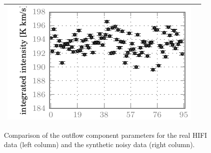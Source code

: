 \begin{figure}[p]
\begin{tabular}{@{}c@{}c@{}}
            \includegraphics{spread_87_outf_iint_noisy}    \\
            \bottomrule
        \end{tabular}
        \caption{
            Comparison of the  outflow component parameters
            for the real HIFI data (left column)
            and the synthetic noisy data (right column).
        }
        \label{fig:fit_outf_87}
    \end{figure}
